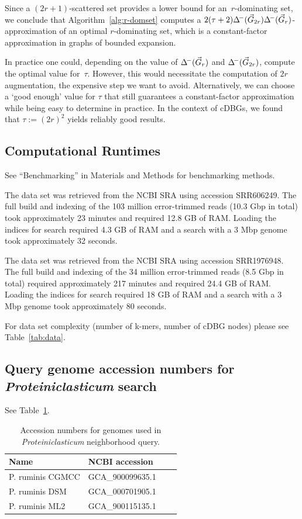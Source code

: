 \noindent
Since a $(2r+1)$-scattered set provides a lower bound for an~$r$-dominating set, we conclude that Algorithm~\ref{alg:r-domset}
computes a $2(\tau+2)\Delta^{\!-}(\vec{G}_{2r})\Delta^{\!-}(\vec{G}_r)$-approximation of an
optimal $r$-dominating set, which is a constant-factor approximation in graphs
of bounded expansion.

In practice one could, depending on the value of $\Delta^{\!-}(\vec{G}_r)$
and $\Delta^{\!-}(\vec{G}_{2r})$, compute the optimal value for~$\tau$. However, this
would necessitate the computation of $2r$ augmentation, the expensive step we
want to avoid. Alternatively, we can choose a `good enough' value for $\tau$
that still guarantees a constant-factor approximation while being easy to
determine in practice. In the context of cDBGs, we found that
$\tau := (2r)^2$ yields reliably good results.

\subsection{Computational Runtimes}
\label{subsec:runtimes}

See ``Benchmarking'' in Materials and Methods for benchmarking methods.

The \podarv data set was retrieved from the NCBI SRA using accession
SRR606249.  The full build and indexing of the 103 million
error-trimmed reads (10.3 Gbp in total) took approximately 23 minutes
and required 12.8 GB of RAM. Loading the indices for search required
4.3 GB of RAM and a search with a 3 Mbp genome took approximately 32
seconds.

The \hu data set was retrieved from the NCBI SRA using accession
SRR1976948. The full build and indexing of the 34 million
error-trimmed reads (8.5 Gbp in total) required approximately 217
minutes and required 24.4 GB of RAM. Loading the indices for search
required 18 GB of RAM and a search with a 3 Mbp genome took
approximately 80 seconds.

For data set complexity (number of k-mers, number of cDBG nodes) please see
Table~\ref{tab:data}.

\subsection{Query genome accession numbers for {\em Proteiniclasticum} search}
\label{subsec:query_accessions}

See Table~\ref{tab:query_accessions}.

\begin{table}[b]
  \begin{tabular}{l l c c }
    \toprule
    Name & NCBI accession \\
    \midrule
    \hline
    P. ruminis CGMCC & GCA\_900099635.1 \\
    P. ruminis DSM & GCA\_000701905.1 \\
    P. ruminis ML2 & GCA\_900115135.1 \\
    \hline
    \bottomrule
  \end{tabular}
  \caption{Accession numbers for genomes used in {\em Proteiniclasticum} neighborhood query.}
  \label{tab:query_accessions}
\end{table}

